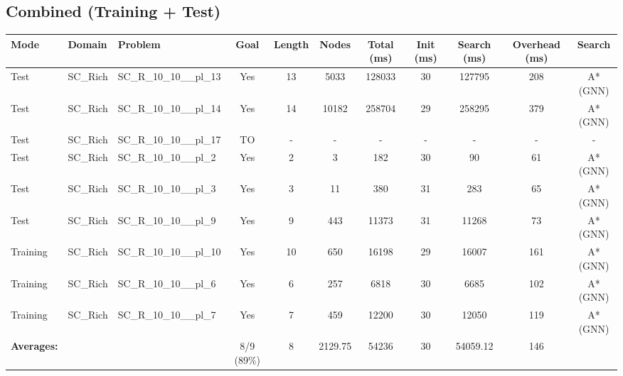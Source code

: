 \documentclass{article}
\begin{document}
\subsection*{Combined (Training + Test)}
\begin{tabular}{lllcccccccc}
\toprule
Mode & Domain & Problem & Goal & Length & Nodes & Total (ms) & Init (ms) & Search (ms) & Overhead (ms) & Search \\
\midrule
Test & SC\_Rich & SC\_R\_10\_10\_\_pl\_13 & Yes & 13 & 5033 & 128033 & 30 & 127795 & 208 & A*(GNN) \\
Test & SC\_Rich & SC\_R\_10\_10\_\_pl\_14 & Yes & 14 & 10182 & 258704 & 29 & 258295 & 379 & A*(GNN) \\
Test & SC\_Rich & SC\_R\_10\_10\_\_pl\_17 & TO & - & - & - & - & - & - & - \\
Test & SC\_Rich & SC\_R\_10\_10\_\_pl\_2 & Yes & 2 & 3 & 182 & 30 & 90 & 61 & A*(GNN) \\
Test & SC\_Rich & SC\_R\_10\_10\_\_pl\_3 & Yes & 3 & 11 & 380 & 31 & 283 & 65 & A*(GNN) \\
Test & SC\_Rich & SC\_R\_10\_10\_\_pl\_9 & Yes & 9 & 443 & 11373 & 31 & 11268 & 73 & A*(GNN) \\
Training & SC\_Rich & SC\_R\_10\_10\_\_pl\_10 & Yes & 10 & 650 & 16198 & 29 & 16007 & 161 & A*(GNN) \\
Training & SC\_Rich & SC\_R\_10\_10\_\_pl\_6 & Yes & 6 & 257 & 6818 & 30 & 6685 & 102 & A*(GNN) \\
Training & SC\_Rich & SC\_R\_10\_10\_\_pl\_7 & Yes & 7 & 459 & 12200 & 30 & 12050 & 119 & A*(GNN) \\
\textbf{Averages:} & & & 8/9 (89\%) & 8 & 2129.75 & 54236 & 30 & 54059.12 & 146 & \\
\bottomrule
\end{tabular}
\newpage
\end{document}
